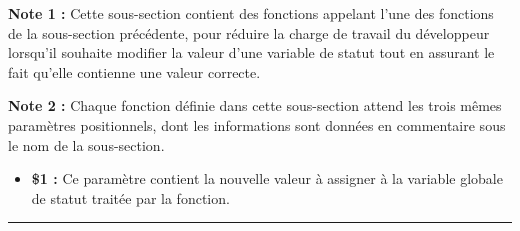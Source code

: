 \documentclass[a4paper,10pt]{article}
\begin{document}
\begin{justify}
    \textbf{Note 1 :} Cette sous-section contient des fonctions appelant l'une des fonctions de la sous-section précédente, pour réduire la charge de travail du développeur lorsqu'il souhaite modifier la valeur d'une variable de statut tout en assurant le fait qu'elle contienne une valeur correcte.
\end{justify}

\setlength{\parskip}{1em}

\begin{justify}
    \textbf{Note 2 :} Chaque fonction définie dans cette sous-section attend les trois mêmes paramètres positionnels, dont les informations sont données en commentaire sous le nom de la sous-section.
\end{justify}

\begin{itemize}
    \item
    {
        \begin{justify}
            \textbf{\$1 :} Ce paramètre contient la nouvelle valeur à assigner à la variable globale de statut traitée par la fonction.
        \end{justify}


    }
\end{itemize}




\color{sec2}\par\noindent\rule{\textwidth}{0.4pt}\color{text}

\color{sec2}
\end{document}
